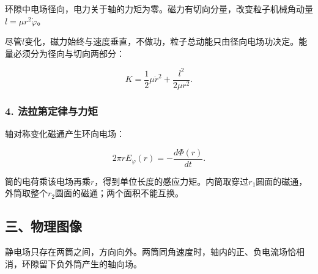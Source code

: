 \documentclass[12pt,a4paper,fontset=fandol]{ctexart}
\begin{document}
环隙中电场径向，电力关于轴的力矩为零。磁力有切向分量，改变粒子机械角动量\(l=\mu r^2\dot\varphi\)。

尽管\(l\)变化，磁力始终与速度垂直，不做功，粒子总动能只由径向电场功决定。能量必须分为径向与切向两部分：

\[
K=\frac12\mu\dot r^2+\frac{l^2}{2\mu r^2}.
\]

\subsubsection{4.
法拉第定律与力矩}\label{ux6cd5ux62c9ux7b2cux5b9aux5f8bux4e0eux529bux77e9}

轴对称变化磁通产生环向电场：

\[
2\pi rE_\varphi(r)=-\frac{d\Phi(r)}{dt}.
\]

筒的电荷乘该电场再乘\(r\)，得到单位长度的感应力矩。内筒取穿过\(r_1\)圆面的磁通，外筒取整个\(r_2\)圆面的磁通；两个面积不能互换。

\subsection{三、物理图像}\label{ux4e09ux7269ux7406ux56feux50cf-5}

静电场只存在两筒之间，方向向外。两筒同角速度时，轴内的正、负电流场恰相消，环隙留下负外筒产生的轴向场。

\begin{center}
\begin{minipage}{\linewidth}
\centering\begingroup{}
\ifdim\wd\diagrambox>.88\linewidth
\sbox{\diagrambox}{\resizebox{.88\linewidth}{!}{\usebox{\diagrambox}}}\fi
\ifdim\ht\diagrambox>.38\textheight
\resizebox{!}{.38\textheight}{\usebox{\diagrambox}}
\else\usebox{\diagrambox}\fi
\par{}\endgroup\end{minipage}\end{center}
\end{document}
